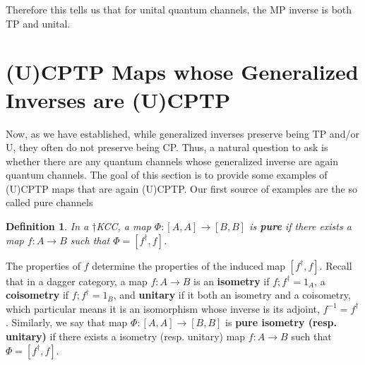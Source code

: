 \documentclass[submission,copyright,creativecommons]{eptcs}
\newtheorem{definition}[observation]{Definition}
\begin{document}
Therefore this tells us that for unital quantum channels, the MP inverse is both TP and unital. 

\section{(U)CPTP Maps whose Generalized Inverses are (U)CPTP}

Now, as we have established, while generalized inverses preserve being TP and/or U, they often do not preserve being CP. Thus, a natural question to ask is whether there are any quantum channels whose generalized inverse are again quantum channels. The goal of this section is to provide some examples of (U)CPTP maps that are again (U)CPTP. Our first source of examples are the so called pure channels

\begin{definition} In a $\dagger$KCC, a map $\Phi: [A,A] \to [B,B]$ is \textbf{pure} if there exists a map $f: A \to B$ such that $\Phi = [f^\dagger,f]$. 
\end{definition}

The properties of $f$ determine the properties of the induced map $[f^\dagger,f]$. Recall that in a dagger category, a map $f: A \to B$ is an \textbf{isometry} if $f;f^\dagger = 1_A$, a \textbf{coisometry} if $f;f^\dagger= 1_B$, and \textbf{unitary} if it both an isometry and a coisometry, which particular means it is an isomorphism whose inverse is its adjoint, $f^{-1} = f^\dagger$. Similarly, we say that map $\Phi: [A,A] \to [B,B]$ is \textbf{pure isometry (resp. unitary)} if there exists a isometry (resp. unitary) map $f: A \to B$ such that $\Phi = [f^\dagger,f]$. 
\end{document}
